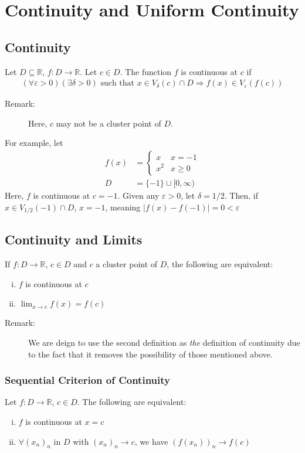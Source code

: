 \documentclass[10pt]{extarticle}
\newcommand{\R}{\mathbb{R}}
\begin{document}
  \section{Continuity and Uniform Continuity}%
  \subsection{Continuity}%
    Let $D\subseteq \R$, $f: D\rightarrow \R$. Let $c\in D$. The function $f$ is continuous at $c$ if
    \begin{align*}
      (\forall \varepsilon > 0)(\exists \delta > 0) \text{ such that } x\in V_{\delta}(c) \cap D \Rightarrow f(x) \in V_{\varepsilon}(f(c))
    \end{align*}
    \begin{description}
      \item[Remark:] Here, $c$ may not be a cluster point of $D$.
    \end{description}
    For example, let
    \begin{align*}
      f(x) &= \begin{cases}
        x & x = -1\\
        x^2 & x \geq 0
      \end{cases}\\
        D &= \{-1\} \cup [0,\infty)
    \end{align*}
    Here, $f$ is continuous at $c = -1$. Given any $\varepsilon > 0$, let $\delta = 1/2$. Then, if $x\in V_{1/2}(-1)\cap D$, $x = -1$, meaning $|f(x) - f(-1)| = 0 < \varepsilon$
  \subsection{Continuity and Limits}%
    If $f: D\rightarrow \R$, $c\in D$ and $c$ a cluster point of $D$, the following are equivalent:
    \begin{enumerate}[(i)]
      \item $f$ is continuous at $c$
      \item $\lim_{x\rightarrow c} f(x) = f(c)$
    \end{enumerate}
    \begin{description}
      \item[Remark:] We are deign to use the second definition as \textit{the} definition of continuity due to the fact that it removes the possibility of those mentioned above.
    \end{description}
  \subsubsection{Sequential Criterion of Continuity}%
    Let $f:D\rightarrow \R$, $c\in D$. The following are equivalent:
    \begin{enumerate}[(i)]
      \item $f$ is continuous at $x = c$
      \item $\forall (x_n)_n$ in $D$ with $(x_n)_n \rightarrow c$, we have $(f(x_n))_n \rightarrow f(c)$
    \end{enumerate}
\end{document}
